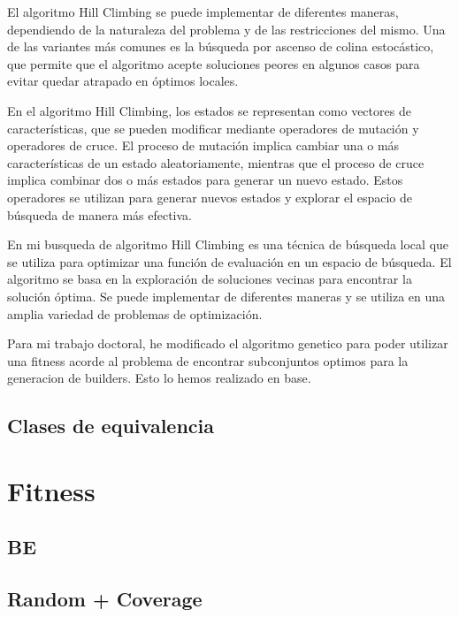 El algoritmo Hill Climbing se puede implementar de diferentes maneras, dependiendo de la naturaleza del problema y de las restricciones del mismo. Una de las variantes más comunes es la búsqueda por ascenso de colina estocástico, que permite que el algoritmo acepte soluciones peores en algunos casos para evitar quedar atrapado en óptimos locales.

En el algoritmo Hill Climbing, los estados se representan como vectores de características, que se pueden modificar mediante operadores de mutación y operadores de cruce. El proceso de mutación implica cambiar una o más características de un estado aleatoriamente, mientras que el proceso de cruce implica combinar dos o más estados para generar un nuevo estado. Estos operadores se utilizan para generar nuevos estados y explorar el espacio de búsqueda de manera más efectiva.

En mi busqueda de algoritmo Hill Climbing es una técnica de búsqueda local que se utiliza para optimizar una función de evaluación en un espacio de búsqueda. El algoritmo se basa en la exploración de soluciones vecinas para encontrar la solución óptima. Se puede implementar de diferentes maneras y se utiliza en una amplia variedad de problemas de optimización.


Para mi trabajo doctoral, he modificado el algoritmo genetico para poder utilizar una fitness acorde al problema de encontrar subconjuntos optimos para la generacion de builders.
Esto lo hemos realizado en base.

\subsection{Clases de equivalencia}
\label{alg:approachCE}
\section{Fitness}
\subsection{BE}

\subsection{Random + Coverage}

